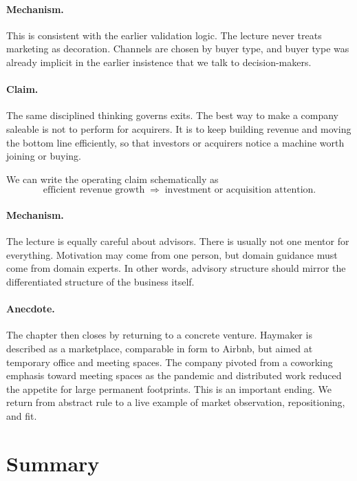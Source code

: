 \paragraph{Mechanism.} This is consistent with the earlier validation logic. The lecture never treats marketing as decoration. Channels are chosen by buyer type, and buyer type was already implicit in the earlier insistence that we talk to decision-makers.

\paragraph{Claim.} The same disciplined thinking governs exits. The best way to make a company saleable is not to perform for acquirers. It is to keep building revenue and moving the bottom line efficiently, so that investors or acquirers notice a machine worth joining or buying.

We can write the operating claim schematically as
\begin{equation}
\text{efficient revenue growth}
\;\Rightarrow\;
\text{investment or acquisition attention}.
\end{equation}

\paragraph{Mechanism.} The lecture is equally careful about advisors. There is usually not one mentor for everything. Motivation may come from one person, but domain guidance must come from domain experts. In other words, advisory structure should mirror the differentiated structure of the business itself.

\paragraph{Anecdote.} The chapter then closes by returning to a concrete venture. Haymaker is described as a marketplace, comparable in form to Airbnb, but aimed at temporary office and meeting spaces. The company pivoted from a coworking emphasis toward meeting spaces as the pandemic and distributed work reduced the appetite for large permanent footprints. This is an important ending. We return from abstract rule to a live example of market observation, repositioning, and fit.

\section{Summary}

